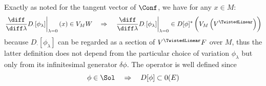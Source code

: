 \documentclass[a4paper,12pt,fleqn]{scrartcl}  %
\begin{document}
Exactly as noted for the tangent vector of $\Conf$, we have for any $x\in M$:
		\begin{displaymath}
			\left.\dfrac{\diff}{\diff \lambda} D_\cdot [\phi_\lambda]\right\rvert_{\lambda=0}(x) \in V_M W
			\quad \Rightarrow \quad
			\left.\dfrac{\diff}{\diff \lambda} D_\cdot [\phi_\lambda]\right\rvert_{\lambda=0} \in D[\phi]^\ast \left( V_M \left( V^\TwistedLinear \right)\right)
		\end{displaymath}
		because $D_\cdot[\phi_\lambda]$ can be regarded as a section of $V^\TwistedLinear F$ over $M$, 
		thus the latter definition does not depend from the particular choice of variation $\phi_\lambda$ 
		but only from its infinitesimal generator $\delta\phi$.
%
The operator is well defined since
\begin{displaymath}
	\phi \in \Sol \quad \Rightarrow \quad D[\phi] \subset 0(E)
\end{displaymath}
\end{document}
